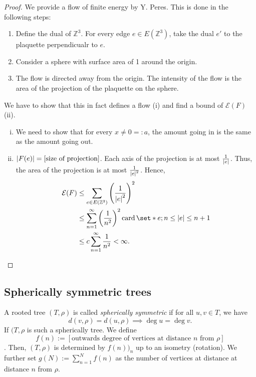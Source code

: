 \begin{proof}
    We provide a flow of finite energy by Y. Peres. This is done in the following steps:
    \begin{enumerate}[1.]
      \item Define the dual of \(\mathbb{Z}^3\). For every edge \(e \in E(\mathbb{Z}^3)\), take the dual \(e'\) to the plaquette perpendicualr to \(e\). 
      \item Consider a sphere with surface area of 1 around the origin.
      \item The flow is directed away from the origin. The intensity of the flow is the area of the projection of the plaquette on the sphere.
    \end{enumerate}
    We have to show that this in fact defines a flow (i) and find a bound of \(\mathcal{E}(F)\) (ii). 
    \begin{enumerate}[(i)]
      \item We need to show that for every \(x \neq 0 =: a\), the amount going in is the same as the amount going out.
      \item \(\abs{F(e)} = \text{[size of projection]}\). Each axis of the projection is at most \(\frac{1}{\abs{e} }\). Thus, the area of the projection is at most \(\frac{1}{\abs{e}^2} \). Hence, 
        \begin{align*}
          \mathcal{E}(F) &\leq \sum_{e \in E(\mathbb{Z}^3)} \left(\frac{1}{\abs{e} ^2}\right)^2 \\
            &\leq\sum_{n=1}^{\infty} \left(\frac{1}{n^2}\right)^2  \operatorname{card}\set*{e; n \leq \abs{e} \leq n+1}\\
            &\leq c \sum_{n=1}^{\infty} \frac{1}{n^2} < \infty.
        \end{align*}
        
    \end{enumerate}
    
\end{proof}



\subsection{Spherically symmetric trees}

\begin{defn}
    
\end{defn}

\begin{defn}
    A rooted tree \((T, \rho) \) is called \emph{spherically symmetric} if for all \(u,v \in T\), we have \[d(v,\rho)= d(u,\rho) \implies \operatorname{deg}u= \operatorname{deg}v.\]
    If \((T, \rho\) is such a spherically tree. We define \[f(n):=[\text{outwards degree of vertices at distance \(n\) from \(\rho\)}]\]. Then, \((T,\rho)\) is determined by \(f(n))_n\) up to an isometry (rotation). We further set \(g(N):= \sum_{n=1}^{N} f(n)\) as the number of vertices at distance at distance \(n\) from \(\rho\).
\end{defn}


